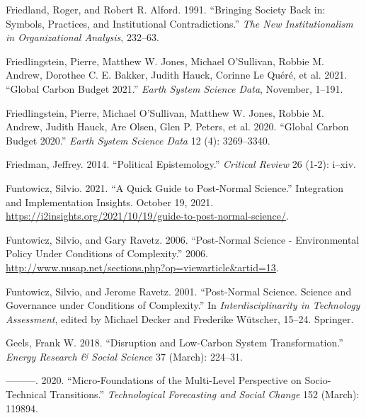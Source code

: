 \documentclass[a4paper, nobind]{templates/ociamthesis}
\newlength{\cslhangindent}
\newenvironment{CSLReferences}[2] %
 {%
  \setlength{\parindent}{0pt}
  \ifodd #1
  \let\oldpar\par
  \def\par{\hangindent=\cslhangindent\oldpar}
  \fi
  \setlength{\parskip}{1mm}
  \setlength{\baselineskip}{6mm}
 }%
 {}
\begin{document}
\begin{CSLReferences}{1}{0}
\leavevmode{}%
Friedland, Roger, and Robert R. Alford. 1991. {``Bringing Society Back in: {Symbols}, Practices, and Institutional Contradictions.''} \emph{The New Institutionalism in Organizational Analysis}, 232--63.

\leavevmode{}%
Friedlingstein, Pierre, Matthew W. Jones, Michael O'Sullivan, Robbie M. Andrew, Dorothee C. E. Bakker, Judith Hauck, Corinne Le Quéré, et al. 2021. {``Global {Carbon Budget} 2021.''} \emph{Earth System Science Data}, November, 1--191.

\leavevmode{}%
Friedlingstein, Pierre, Michael O'Sullivan, Matthew W. Jones, Robbie M. Andrew, Judith Hauck, Are Olsen, Glen P. Peters, et al. 2020. {``Global {Carbon Budget} 2020.''} \emph{Earth System Science Data} 12 (4): 3269--3340.

\leavevmode{}%
Friedman, Jeffrey. 2014. {``Political {Epistemology}.''} \emph{Critical Review} 26 (1-2): i--xiv.

\leavevmode{}%
Funtowicz, Silvio. 2021. {``A Quick Guide to Post-Normal Science.''} {Integration and Implementation Insights}. October 19, 2021. \url{https://i2insights.org/2021/10/19/guide-to-post-normal-science/}.

\leavevmode{}%
Funtowicz, Silvio, and Gary Ravetz. 2006. {``Post-Normal {Science} - {Environmental Policy} Under {Conditions} of {Complexity}.''} 2006. \url{http://www.nusap.net/sections.php?op=viewarticle\&artid=13}.

\leavevmode{}%
Funtowicz, Silvio, and Jerome Ravetz. 2001. {``Post-Normal Science. Science and Governance under Conditions of Complexity.''} In \emph{Interdisciplinarity in Technology Assessment}, edited by Michael Decker and Frederike Wütscher, 15--24. {Springer}.

\leavevmode{}%
Geels, Frank W. 2018. {``Disruption and Low-Carbon System Transformation.''} \emph{Energy Research \& Social Science} 37 (March): 224--31.

\leavevmode{}%
---------. 2020. {``Micro-Foundations of the Multi-Level Perspective on Socio-Technical Transitions.''} \emph{Technological Forecasting and Social Change} 152 (March): 119894.


\end{CSLReferences}
\end{document}
